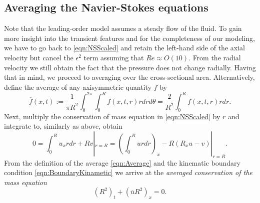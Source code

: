 \documentclass[12pt,a4paper]{article}
\begin{document}
\subsection{Averaging the Navier-Stokes equations}
Note that the leading-order model assumes a steady flow of the fluid. To gain more insight into the transient features and for the completeness of our modeling, we have to go back to \eqref{eqn:NSScaled} and retain the left-hand side of the axial velocity but cancel the $\epsilon^2$ term assuming that $Re \approx O(10)$. From the radial velocity we still obtain the fact that the pressure does not change radially. Having that in mind, we proceed to averaging over the cross-sectional area. Alternatively, define the average of any axisymmetric quantity $f$ by
\begin{equation}\label{eqn:Average}
	\overline{f}(x,t) := \frac{1}{\pi R^2}\int_0^{2\pi}\int_0^R f(x,t,r) r dr d\theta = \frac{2}{R^2} \int_0^R f(x,t,r) r dr.   
\end{equation}
Next, multiply the conservation of mass equation in \eqref{eqn:NSScaled} by $r$ and integrate to, similarly as above, obtain
\begin{equation}
	0 = \int_0^R u_x rdr + R v|_{r=R} = \left(\int_0^R u rdr\right)_x - R \left(R_x u - v\right)|_{r=R}. 
\end{equation}
From the definition of the average \eqref{eqn:Average} and the kinematic boundary condition \eqref{eqn:BoundaryKinametic} we arrive at the \textit{ averaged conservation of the mass equation}
\begin{equation}\label{eqn:ConservationOfMassAvg}
	(R^2)_t + \left(\overline{u} R^2\right)_x = 0.
\end{equation}
\end{document}
